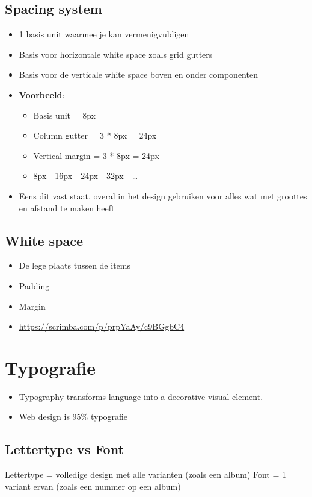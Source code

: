 \documentclass{article}
\newcommand{\bold}[1]{\textbf{#1}}
\begin{document}
\subsection{Spacing system}

\begin{itemize}
    \item 1 basis unit waarmee je kan vermenigvuldigen
    \item Basis voor horizontale white space zoals grid gutters
    \item Basis voor de verticale white space boven en onder componenten
    \item \bold{Voorbeeld}:
    \begin{itemize}
        \item Basis unit = 8px
        \item Column gutter = 3 * 8px = 24px
        \item Vertical margin = 3 * 8px = 24px
        \item 8px - 16px - 24px - 32px - \dots
    \end{itemize}
    \item Eens dit vast staat, overal in het design gebruiken voor alles wat met groottes en afstand te maken heeft
\end{itemize}

\subsection{White space}
\begin{itemize}
    \item De lege plaats tussen de items
    \item Padding
    \item Margin
    \item \url{https://scrimba.com/p/prpYaAy/c9BGgbC4}
\end{itemize}

\section{Typografie}
\begin{itemize}
    \item Typography transforms language into a decorative visual element.
    \item Web design is 95\% typografie
\end{itemize}

\subsection{Lettertype vs Font}
Lettertype = volledige design met alle varianten (zoals een album)
Font = 1 variant ervan (zoals een nummer op een album)
\end{document}
